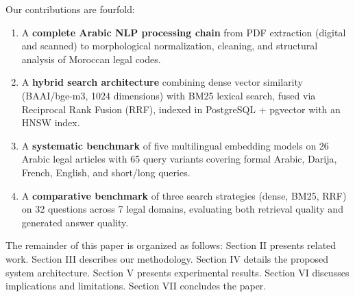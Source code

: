 \noindent Our contributions are fourfold:

\begin{enumerate}
    \item A \textbf{complete Arabic NLP processing chain} from PDF extraction
    (digital and scanned) to morphological normalization, cleaning, and
    structural analysis of Moroccan legal codes.
    \item A \textbf{hybrid search architecture} combining dense vector
    similarity (BAAI/bge-m3, 1024 dimensions) with BM25 lexical search,
    fused via Reciprocal Rank Fusion (RRF), indexed in PostgreSQL + pgvector
    with an HNSW index.
    \item A \textbf{systematic benchmark} of five multilingual embedding
    models on 26 Arabic legal articles with 65 query variants covering
    formal Arabic, Darija, French, English, and short/long queries.
    \item A \textbf{comparative benchmark} of three search strategies (dense,
    BM25, RRF) on 32 questions across 7 legal domains, evaluating both
    retrieval quality and generated answer quality.
\end{enumerate}

\vspace{0.2cm}

\noindent The remainder of this paper is organized as follows: Section II
presents related work. Section III describes our methodology. Section IV
details the proposed system architecture. Section V presents experimental
results. Section VI discusses implications and limitations. Section VII
concludes the paper.
